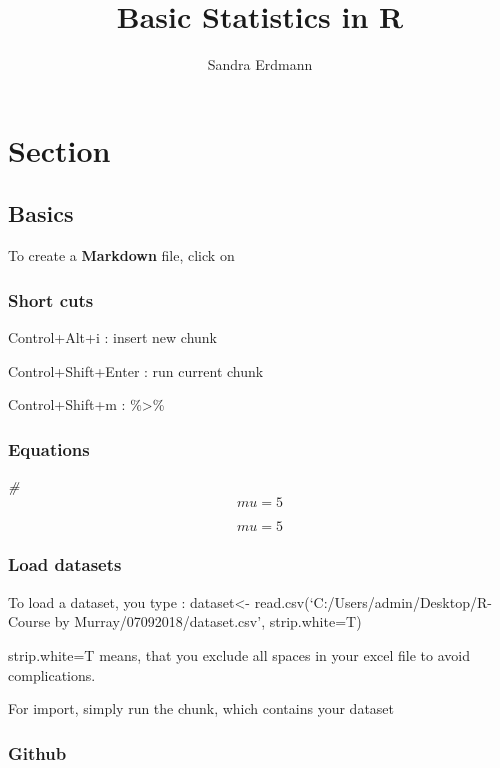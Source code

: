 \documentclass[]{article}
\title{Basic Statistics in R}
\author{Sandra Erdmann}
\date{}
\newenvironment{Shaded}{\begin{snugshade}}{\end{snugshade}}
\newcommand{\CommentTok}[1]{\textcolor[rgb]{0.56,0.35,0.01}{\textit{#1}}}
\begin{document}
\maketitle

\section{Section}\label{section}

\subsection{Basics}\label{basics}

To create a \textbf{Markdown} file, click on

\subsubsection{Short cuts}\label{short-cuts}

Control+Alt+i : insert new chunk

Control+Shift+Enter : run current chunk

Control+Shift+m : \%\textgreater{}\%

\subsubsection{Equations}\label{equations}

\begin{Shaded}
\begin{Highlighting}[]
\CommentTok{# $$ mu = 5 $$}
\end{Highlighting}
\end{Shaded}

\[ mu = 5 \]

\subsubsection{Load datasets}\label{load-datasets}

To load a dataset, you type : dataset\textless{}-
read.csv(`C:/Users/admin/Desktop/R-Course by
Murray/07092018/dataset.csv', strip.white=T)

strip.white=T means, that you exclude all spaces in your excel file to
avoid complications.

For import, simply run the chunk, which contains your dataset

\subsubsection{Github}\label{github}
\end{document}
